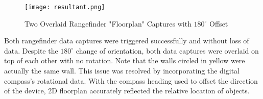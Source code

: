 \begin{figure}[H]
	\centerline{\texttt{[image: resultant.png]}}
	\caption{Two Overlaid Rangefinder "Floorplan" Captures with $180^\circ$ Offset}
	\label{resultant}
\end{figure}

Both rangefinder data captures were triggered successfully and without loss of data. Despite the $180^\circ$ change of orientation, both data captures were overlaid on top of each other with no rotation. Note that the walls circled in yellow were actually the same wall. This issue was resolved by incorporating the digital compass's rotational data. With the compass heading used to offset the direction of the device, 2D floorplan accurately reflected the relative location of objects.




